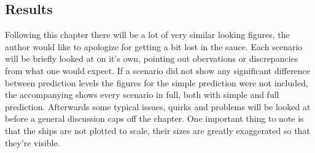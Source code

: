 \subsection{Results}
Following this chapter there will be a lot of very similar looking figures, the author would like to apologize for getting a bit lost in the sauce. 
Each scenario will be briefly looked at on it's own, pointing out obervations or discrepancies from what one would expect. If a scenario did not show
any significant difference between prediction levels the figures for the simple prediction were not included, the accompanying shows
every scenario in full, both with simple and full prediction. Afterwards some typical issues, quirks and problems will be looked at before a general
discussion caps off the chapter. One important thing to note is that the ships are not plotted to scale, their sizes are greatly exaggerated so that they're
visible.



